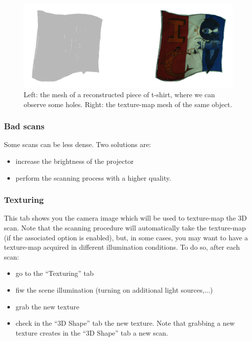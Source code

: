 \documentclass[11pt]{article}
\begin{document}
 \begin{figure}[h]
 	\begin{center}
 		\includegraphics[width=15 cm]{images/illustration_blackregions.png}
 	\end{center}
 	\caption{Left: the mesh of a reconstructed piece of t-shirt, where we can observe some holes. Right: the texture-map mesh of the same object.}
 	\label{fig:blackRegions}
 \end{figure}
 
\subsubsection{Bad scans}
Some scans can be less dense. Two solutions are:
\begin{itemize}
\item increase the brightness of the projector
\item perform the scanning process with a higher quality.
\end{itemize}

\subsubsection{Texturing}
This tab shows you the camera image which will be used to texture-map the 3D scan.
Note that the scanning procedure will automatically take the texture-map (if the associated option is enabled), but, in some cases, you may want to have a texture-map acquired in different illumination conditions.
To do so, after each scan:
\begin{itemize}
\item go to the ``Texturing'' tab
\item fiw the scene illumination (turning on additional light sources,...)
\item grab the new texture
\item check in the ``3D Shape'' tab the new texture. Note that grabbing a new texture creates in the ``3D Shape'' tab a new scan.
\end{itemize} 
\end{document}
